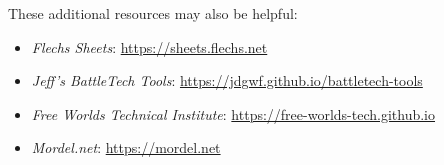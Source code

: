 These additional resources may also be helpful:

\begin{itemize}

\item \emph{Flechs Sheets}: \href{https://sheets.flechs.net}{https://sheets.flechs.net}

\item \emph{Jeff's BattleTech Tools}: \href{https://jdgwf.github.io/battletech-tools}{https://jdgwf.github.io/battletech-tools}

\item \emph{Free Worlds Technical Institute}: \href{https://free-worlds-tech.github.io}{https://free-worlds-tech.github.io}

\item \emph{Mordel.net}: \href{https://mordel.net}{https://mordel.net}

\end{itemize}
